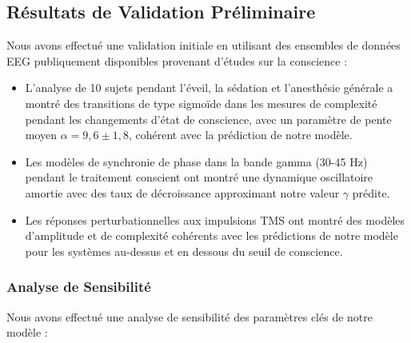 \documentclass[12pt]{article}
\begin{document}
\subsection{Résultats de Validation Préliminaire}

Nous avons effectué une validation initiale en utilisant des ensembles de données EEG publiquement disponibles provenant d'études sur la conscience \cite{chennu2014,schartner2015} :

\begin{itemize}
    \item L'analyse de 10 sujets pendant l'éveil, la sédation et l'anesthésie générale a montré des transitions de type sigmoïde dans les mesures de complexité pendant les changements d'état de conscience, avec un paramètre de pente moyen $\alpha = 9,6 \pm 1,8$, cohérent avec la prédiction de notre modèle.
    
    \item Les modèles de synchronie de phase dans la bande gamma (30-45 Hz) pendant le traitement conscient ont montré une dynamique oscillatoire amortie avec des taux de décroissance approximant notre valeur $\gamma$ prédite.
    
    \item Les réponses perturbationnelles aux impulsions TMS ont montré des modèles d'amplitude et de complexité cohérents avec les prédictions de notre modèle pour les systèmes au-dessus et en dessous du seuil de conscience.
\end{itemize}

\subsubsection{Analyse de Sensibilité}
Nous avons effectué une analyse de sensibilité des paramètres clés de notre modèle :
\end{document}
